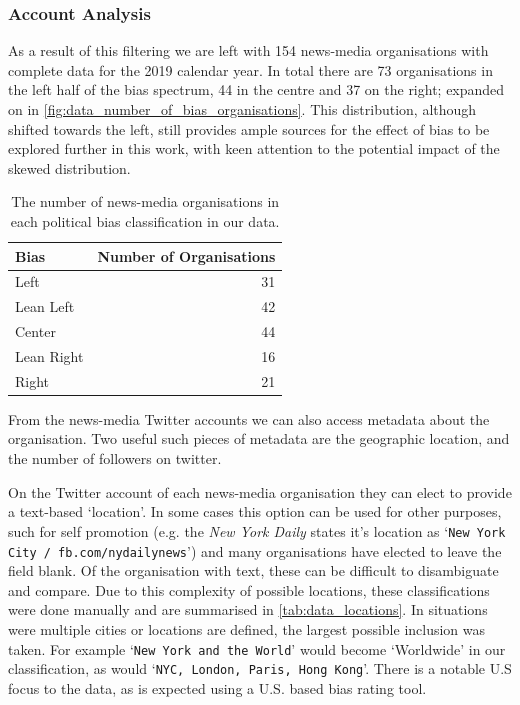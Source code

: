 \subsubsection{Account Analysis}
As a result of this filtering we are left with 154 news-media organisations with complete data for the 2019 calendar year. %
In total there are 73 organisations in the left half of the bias spectrum, 44 in the centre and 37 on the right; expanded on in \autoref{fig:data_number_of_bias_organisations}. This distribution, although shifted towards the left, still provides ample sources for the effect of bias to be explored further in this work, with keen attention to the potential impact of the skewed distribution. 

\begin{table}[h!]
	\centering
	\begin{tabular}{lr}
		\toprule
		Bias &   Number of Organisations \\
		\midrule
		{\color{Left} Left }&  31 \\
		{\color{LeanLeft} Lean Left }&  42 \\
		{\color{Center} Center }&  44 \\
		{\color{LeanRight} Lean Right }&  16 \\
		{\color{Right} Right }&  21 \\
		\bottomrule
	\end{tabular}
	\caption{The number of news-media organisations in each political bias classification in our data.}
	\label{fig:data_number_of_bias_organisations}
\end{table}

From the news-media Twitter accounts we can also access metadata about the organisation. Two useful such pieces of metadata are the geographic location, and the number of followers on twitter.

On the Twitter account of each news-media organisation they can elect to provide a text-based `location'. In some cases this option can be used for other purposes, such for self promotion (e.g. the \emph{New York Daily} states it's location as `\texttt{New York City  /  fb.com/nydailynews}') and many organisations have elected to leave the field blank. 
Of the organisation with text, these can be difficult to disambiguate and compare. Due to this complexity of possible locations, these classifications were done manually and are summarised in \autoref{tab:data_locations}. In situations were multiple cities or locations are defined, the largest possible inclusion was taken. For example `\texttt{New York and the World}' would become `Worldwide' in our classification, as would `\texttt{NYC, London, Paris, Hong Kong}'. There is a notable U.S focus to the data, as is expected using a U.S. based bias rating tool.

